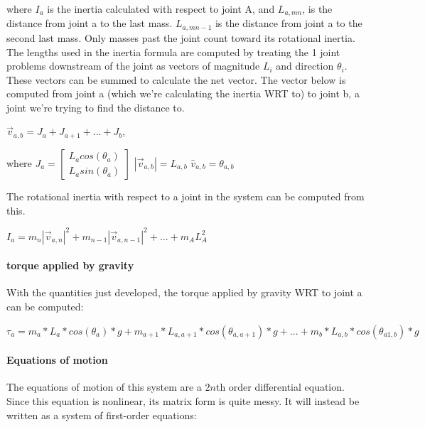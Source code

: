 \documentclass{article}
\begin{document}
\noindent \justifying where $I_a$ is the inertia calculated with respect to joint A, and $L_{a,mn}$, is the distance from joint a to the last mass. $L_{a,mn-1}$ is the distance from joint a to the second last mass. Only masses past the joint count toward its rotational inertia. The lengths used in the inertia formula are computed by treating the 1 joint problems downstream of the joint as  vectors of magnitude $L_i$ and direction $\theta_i$. These vectors can be summed to calculate the net vector. The vector below is computed from joint a (which we're calculating the inertia WRT to) to joint b, a joint we're trying to find the distance to. 

\vspace{24pt}
\centering $\vec{v}_{a,b} = J_a + J_{a+1} + ... + J_b$,
\vspace{14pt}

\indent where $J_a =  \begin{bmatrix} L_acos(\theta_a) \\ L_asin(\theta_a) \end{bmatrix}$ 
 \hspace{1cm}   $|\vec{v}_{a,b}| = L_{a,b}$  \hspace{1cm} $\hat v_{a,b} = \theta_{a,b}$
 \vspace{24pt}
 \newpage

The rotational inertia with respect to a joint in the system can be computed from this.

\vspace{24pt}
\centering $I_a = m_n|\vec{v}_{a,n}|^2 + m_{n-1}|\vec{v}_{a,n-1}|^2 + ... + m_AL_A^2$
\vspace{14pt}


\paragraph{torque applied by gravity} 
With the quantities just developed, the torque applied by gravity WRT to joint a can be computed:
\vspace{24pt}

$\tau_a = m_a*L_{a}*cos(\theta_a)*g + m_{a+1}*L_{a,a+1}*cos(\theta_{a,a+1})*g + ... + m_{b}*L_{a,b}*cos(\theta_{a1,b})*g$

\vspace{24pt}

\paragraph{Equations of motion} 
\noindent \justifying The equations of motion of this system are a $2n$th order differential equation. Since this equation is nonlinear, its matrix form is quite messy. It will instead be written as a system of first-order equations:
\end{document}
